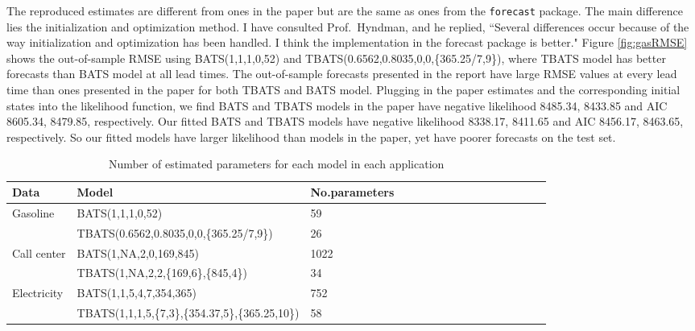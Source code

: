 \documentclass{uwstat572}
\begin{document}
The reproduced estimates are different from ones in the paper but are the same as ones from the \texttt{forecast} package. The main difference lies the initialization and optimization method. I have consulted Prof.\ Hyndman, and he replied, ``Several differences occur because of the way initialization and optimization has been handled. I think the implementation in the forecast package is better." Figure \ref{fig:gasRMSE} shows the out-of-sample RMSE using BATS(1,1,1,0,52) and TBATS(0.6562,0.8035,0,0,\{365.25/7,9\}), where TBATS model has better forecasts than BATS model at all lead times. The out-of-sample forecasts presented in the report have large RMSE values at every lead time than ones presented in the paper for both TBATS and BATS model. Plugging in the paper estimates and the corresponding initial states into the likelihood function, we find BATS and TBATS models in the paper have negative likelihood 8485.34, 8433.85 and AIC 8605.34, 8479.85, respectively. Our fitted BATS and TBATS models have negative likelihood 8338.17, 8411.65 and AIC 8456.17, 8463.65, respectively. So our fitted models have larger likelihood than models in the paper, yet have poorer forecasts on the test set. 
\begin{table}[]
\small
\centering
\caption{Number of estimated parameters for each model in each application}
\label{table:number}
\begin{tabular}{l l l l l l l l l l l l l l l l}
\hline \hline
Data & Model & No.parameters \\ \hline
Gasoline & BATS(1,1,1,0,52) & 59 \\
 & TBATS(0.6562,0.8035,0,0,\{365.25/7,9\}) & 26 \\
 Call center & BATS(1,NA,2,0,169,845) & 1022  \\
  & TBATS(1,NA,2,2,\{169,6\},\{845,4\}) & 34  \\
 Electricity & BATS(1,1,5,4,7,354,365) & 752  \\
  & TBATS(1,1,1,5,\{7,3\},\{354.37,5\},\{365.25,10\}) & 58  \\ \hline
\end{tabular}
\end{table}
\end{document}

